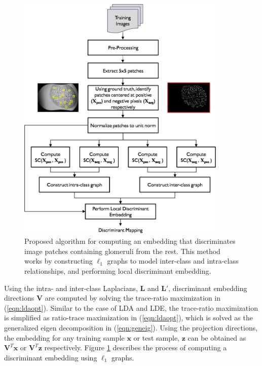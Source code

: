 \begin{figure}[t]
\begin{minipage}[b]{1.0\linewidth}
  \centering
  \includegraphics[width=10cm]{train.png}
\end{minipage}
\caption{Proposed algorithm for computing an embedding that discriminates image patches containing glomeruli from the rest. This method works by constructing $\ell_1$ graphs to model inter-class and intra-class relationships, and performing local discriminant embedding.}
\label{Fig:train}
\end{figure}


Using the intra- and inter-class Laplacians, $\mathbf{L}$ and $\mathbf{L}'$, discriminant embedding directions $\mathbf{V}$ are computed by solving the trace-ratio maximization in (\ref{eqn:ldaopt}). Similar to the case of LDA and LDE, the trace-ratio maximization is simplified as ratio-trace maximization in (\ref{eqn:ldaopt}), which is solved as the generalized eigen decomposition in (\ref{eqn:geneig}). Using the projection directions, the embedding for any training sample $\mathbf{x}$ or test sample, $\mathbf{z}$ can be obtained as $\mathbf{V}^T\mathbf{x}$ or $\mathbf{V}^T\mathbf{z}$ respectively. Figure \ref{Fig:train} describes the process of computing a discriminant embedding using $\ell_1$ graphs. 
 
